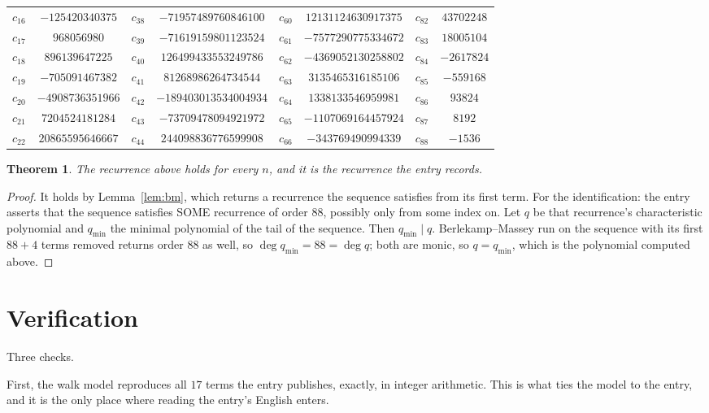 \documentclass[11pt,a4paper]{article}
\theoremstyle{plain}
\newtheorem{theorem}{Theorem}
\theoremstyle{definition}
\begin{document}
\begin{center}
\begin{tabular}{cccccccc}
$c_{16}$ & $-125420340375$ & $c_{38}$ & $-71957489760846100$ & $c_{60}$ & $12131124630917375$ & $c_{82}$ & $43702248$ \\
$c_{17}$ & $968056980$ & $c_{39}$ & $-71619159801123524$ & $c_{61}$ & $-7577290775334672$ & $c_{83}$ & $18005104$ \\
$c_{18}$ & $896139647225$ & $c_{40}$ & $126499433553249786$ & $c_{62}$ & $-4369052130258802$ & $c_{84}$ & $-2617824$ \\
$c_{19}$ & $-705091467382$ & $c_{41}$ & $81268986264734544$ & $c_{63}$ & $3135465316185106$ & $c_{85}$ & $-559168$ \\
$c_{20}$ & $-4908736351966$ & $c_{42}$ & $-189403013534004934$ & $c_{64}$ & $1338133546959981$ & $c_{86}$ & $93824$ \\
$c_{21}$ & $7204524181284$ & $c_{43}$ & $-73709478094921972$ & $c_{65}$ & $-1107069164457924$ & $c_{87}$ & $8192$ \\
$c_{22}$ & $20865595646667$ & $c_{44}$ & $244098836776599908$ & $c_{66}$ & $-343769490994339$ & $c_{88}$ & $-1536$ \\
\end{tabular}
\end{center}

\begin{theorem}
The recurrence above holds for every $n$, and it is the recurrence the entry records.
\end{theorem}

\begin{proof}
It holds by Lemma~\ref{lem:bm}, which returns a recurrence the sequence satisfies from its
first term. For the identification: the entry asserts that the sequence satisfies SOME
recurrence of order $88$, possibly only from some index on. Let $q$ be that recurrence's
characteristic polynomial and $q_{\min}$ the minimal polynomial of the tail of the sequence.
Then $q_{\min}\mid q$. Berlekamp--Massey run on the sequence with its first $88+4$ terms
removed returns order $88$ as well, so $\deg q_{\min}=88=\deg q$; both are monic, so
$q=q_{\min}$, which is the polynomial computed above.
\end{proof}

\section{Verification}

Three checks.

First, the walk model reproduces all $17$ terms the entry publishes, exactly, in integer
arithmetic. This is what ties the model to the entry, and it is the only place where reading
the entry's English enters.
\end{document}
